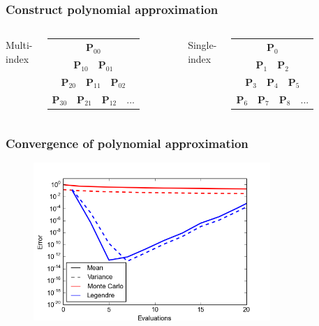 \documentclass[handout]{beamer}
\begin{document}
\begin{frame}
  \frametitle{Construct polynomial approximation}
  \begin{columns}[c] 
      Multi-index\\
    \begin{tabular}{c}
    \\
      $\mathbf{P}_{00}$\\
    $\mathbf{P}_{10} \quad \mathbf{P}_{01}$\\
    $\mathbf{P}_{20} \quad \mathbf{P}_{11}\quad \mathbf{P}_{02}$\\
    $\mathbf{P}_{30} \quad \mathbf{P}_{21}\quad \mathbf{P}_{12}\quad ...$ 
  \end{tabular}


Single-index\\
\begin{tabular}{c}
\\
    $\mathbf{P}_{0}$\\
    $\mathbf{P}_{1} \quad \mathbf{P}_{2}$\\
    $\mathbf{P}_{3} \quad \mathbf{P}_{4}\quad \mathbf{P}_{5}$\\
    $\mathbf{P}_{6} \quad \mathbf{P}_{7}\quad \mathbf{P}_{8}\quad ...$ 
  \end{tabular}
  \end{columns}
\end{frame}

\begin{frame}
  \frametitle{Convergence of polynomial approximation}

  \begin{figure}
    \includegraphics[width=0.8\textwidth]{MC_convergence_1D_2.png}
  \end{figure}
  
\end{frame}
\end{document}
